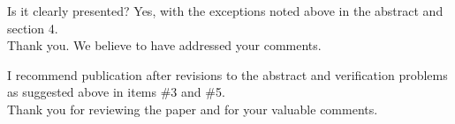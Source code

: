 \documentclass{article}
\newcommand{\tcr}[1]{\textcolor{red}{#1}}
\begin{document}
{\color{blue}
Is it clearly presented?
Yes, with the exceptions noted above in the abstract and section 4. \\
}
Thank you. We believe to have addressed your comments.
\bigskip

%

{\color{blue}
I recommend publication after revisions to the abstract and verification problems as suggested above in items \#3 and \#5. \\
}
Thank you for reviewing the paper and for your valuable comments.
\end{document}
